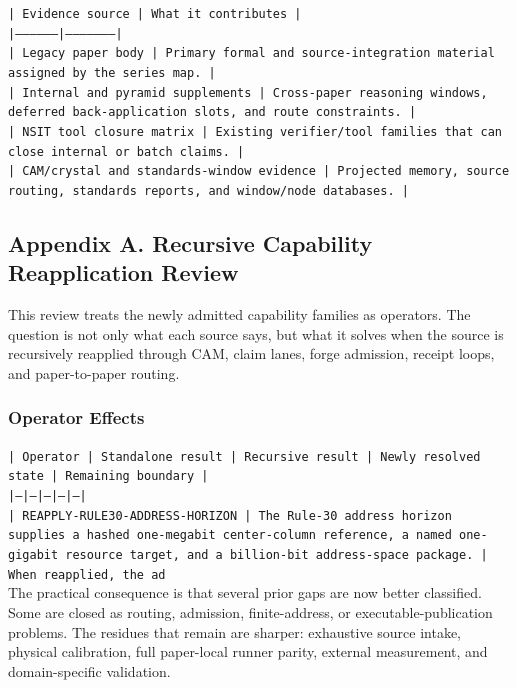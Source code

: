 \documentclass[11pt]{article}
\begin{document}
\noindent\texttt{| Evidence source | What it contributes |}\\
\noindent\texttt{|-----------------|---------------------|}\\
\noindent\texttt{| Legacy paper body | Primary formal and source-integration material assigned by the series map. |}\\
\noindent\texttt{| Internal and pyramid supplements | Cross-paper reasoning windows, deferred back-application slots, and route constraints. |}\\
\noindent\texttt{| NSIT tool closure matrix | Existing verifier/tool families that can close internal or batch claims. |}\\
\noindent\texttt{| CAM/crystal and standards-window evidence | Projected memory, source routing, standards reports, and window/node databases. |}\\

\subsection*{Appendix A. Recursive Capability Reapplication Review}

This review treats the newly admitted capability families as operators. The question is not only what each source says, but what it solves when the source is recursively reapplied through CAM, claim lanes, forge admission, receipt loops, and paper-to-paper routing.

\subsubsection*{Operator Effects}

\noindent\texttt{| Operator | Standalone result | Recursive result | Newly resolved state | Remaining boundary |}\\
\noindent\texttt{|---|---|---|---|---|}\\
\noindent\texttt{| REAPPLY-RULE30-ADDRESS-HORIZON | The Rule-30 address horizon supplies a hashed one-megabit center-column reference, a named one-gigabit resource target, and a billion-bit address-space package. | When reapplied, the ad}\\

The practical consequence is that several prior gaps are now better classified. Some are closed as routing, admission, finite-address, or executable-publication problems. The residues that remain are sharper: exhaustive source intake, physical calibration, full paper-local runner parity, external measurement, and domain-specific validation.
\end{document}
